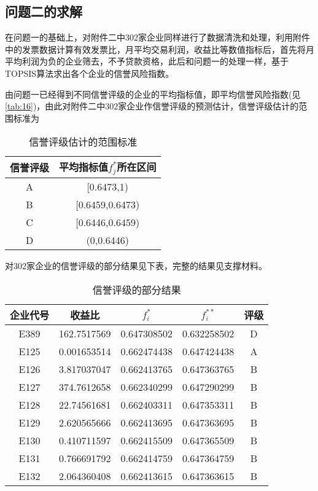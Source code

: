 \documentclass{cumcmthesis}
\begin{document}
\subsection{问题二的求解}
在问题一的基础上，对附件二中302家企业同样进行了数据清洗和处理，利用附件中的发票数据计算有效发票比，月平均交易利润，收益比等数值指标后，首先将月平均利润为负的企业筛去，不予贷款资格，此后和问题一的处理一样，基于TOPSIS算法求出各个企业的信誉风险指数。

由问题一已经得到不同信誉评级的企业的平均指标值，即平均信誉风险指数(见\cref{tab:16})，由此对附件二中302家企业作信誉评级的预测估计，信誉评级估计的范围标准为

\begin{table}[H]   %
	\caption{信誉评级估计的范围标准}\label{tab:23} \centering
	\begin{tabular}{cc}
		\toprule[1.5pt]
		信誉评级 & 平均指标值$f_j^*$所在区间 \\
		\midrule[1pt]
		A & [0.6473,1)\\
		B & [0.6459,0.6473)\\
		C & [0.6446,0.6459)\\
		D & (0,0.6446)\\
		\bottomrule[1.5pt]
	\end{tabular}
\end{table}

对302家企业的信誉评级的部分结果见下表，完整的结果见支撑材料。
\begin{table}[H]   %
	\caption{信誉评级的部分结果}\label{tab:24} \centering
	\begin{tabular}{ccccc}
		\toprule[1.5pt]
企业代号 & 收益比  & $f_i^*$   & $f_i^{**}$     & 评级 \\
		\midrule[1pt]
E389 & 162.7517569 & 0.647308502 & 0.632258502 & D  \\
E125 & 0.001653514 & 0.662474438 & 0.647424438 & A  \\
E126 & 3.817037047 & 0.662413765 & 0.647363765 & B  \\
E127 & 374.7612658 & 0.662340299 & 0.647290299 & B  \\
E128 & 22.74561681 & 0.662403311 & 0.647353311 & B  \\
E129 & 2.620565666 & 0.662413695 & 0.647363695 & B  \\
E130 & 0.410711597 & 0.662415509 & 0.647365509 & B  \\
E131 & 0.766691792 & 0.662414759 & 0.647364759 & B  \\
E132 & 2.064360408 & 0.662413615 & 0.647363615 & B \\
		\bottomrule[1.5pt]
\end{tabular}
\end{table}
\end{document}

